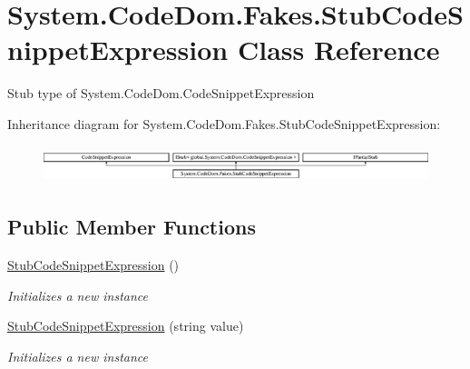 \hypertarget{class_system_1_1_code_dom_1_1_fakes_1_1_stub_code_snippet_expression}{\section{System.\-Code\-Dom.\-Fakes.\-Stub\-Code\-Snippet\-Expression Class Reference}
\label{class_system_1_1_code_dom_1_1_fakes_1_1_stub_code_snippet_expression}
}


Stub type of System.\-Code\-Dom.\-Code\-Snippet\-Expression 


Inheritance diagram for System.\-Code\-Dom.\-Fakes.\-Stub\-Code\-Snippet\-Expression\-:\begin{figure}[H]
\begin{center}
\leavevmode
\includegraphics[height=1.075889cm]{class_system_1_1_code_dom_1_1_fakes_1_1_stub_code_snippet_expression}
\end{center}
\end{figure}
\subsection*{Public Member Functions}
\begin{DoxyCompactItemize}
\item 
\hyperlink{class_system_1_1_code_dom_1_1_fakes_1_1_stub_code_snippet_expression_a0b7325fea7f8e4a808aafc517d408ebe}{Stub\-Code\-Snippet\-Expression} ()
\begin{DoxyCompactList}\small\item\em Initializes a new instance\end{DoxyCompactList}\item 
\hyperlink{class_system_1_1_code_dom_1_1_fakes_1_1_stub_code_snippet_expression_a4796cc752b217e50bd83e0a6df3bc1aa}{Stub\-Code\-Snippet\-Expression} (string value)
\begin{DoxyCompactList}\small\item\em Initializes a new instance\end{DoxyCompactList}\end{DoxyCompactItemize}
